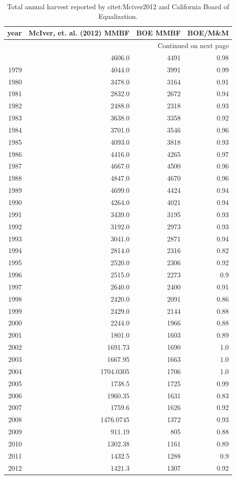 \documentclass[a4paper]{article}
\begin{document}
\begin{longtable}{rrrr}
\caption{Total annual harvest reported by citet:Mciver2012 and California Board of Equalization.}
\\
year & McIver, et. al. (2012) MMBF & BOE MMBF & BOE/M\&M\\
\hline
\endhead
\hline\multicolumn{4}{r}{Continued on next page} \\
\endfoot
\endlastfoot
1978 & 4606.0 & 4491 & 0.98\\
1979 & 4044.0 & 3991 & 0.99\\
1980 & 3478.0 & 3164 & 0.91\\
1981 & 2832.0 & 2672 & 0.94\\
1982 & 2488.0 & 2318 & 0.93\\
1983 & 3638.0 & 3358 & 0.92\\
1984 & 3701.0 & 3546 & 0.96\\
1985 & 4093.0 & 3818 & 0.93\\
1986 & 4416.0 & 4265 & 0.97\\
1987 & 4667.0 & 4500 & 0.96\\
1988 & 4847.0 & 4670 & 0.96\\
1989 & 4699.0 & 4424 & 0.94\\
1990 & 4264.0 & 4021 & 0.94\\
1991 & 3439.0 & 3195 & 0.93\\
1992 & 3192.0 & 2973 & 0.93\\
1993 & 3041.0 & 2871 & 0.94\\
1994 & 2814.0 & 2316 & 0.82\\
1995 & 2520.0 & 2306 & 0.92\\
1996 & 2515.0 & 2273 & 0.9\\
1997 & 2640.0 & 2400 & 0.91\\
1998 & 2420.0 & 2091 & 0.86\\
1999 & 2429.0 & 2144 & 0.88\\
2000 & 2244.0 & 1966 & 0.88\\
2001 & 1801.0 & 1603 & 0.89\\
2002 & 1691.73 & 1690 & 1.0\\
2003 & 1667.95 & 1663 & 1.0\\
2004 & 1704.0305 & 1706 & 1.0\\
2005 & 1738.5 & 1725 & 0.99\\
2006 & 1960.35 & 1631 & 0.83\\
2007 & 1759.6 & 1626 & 0.92\\
2008 & 1476.0745 & 1372 & 0.93\\
2009 & 911.19 & 805 & 0.88\\
2010 & 1302.38 & 1161 & 0.89\\
2011 & 1432.5 & 1288 & 0.9\\
2012 & 1421.3 & 1307 & 0.92\\
\end{longtable}
\end{document}
